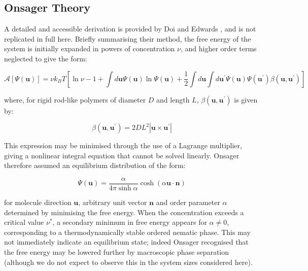 \documentclass[11pt, a4paper]{article} %
\begin{document}
\printbibliography

\begin{appendices}

\section{Onsager Theory} \label{sec:OnsagerAppendix}
A detailed and accessible derivation is provided by Doi and Edwards \cite{Doi1988}, and is not replicated in full here. Briefly summarising their method, the free energy of the system is initially expanded in powers of concentration $\nu$, and higher order terms neglected to give the form:

\begin{equation} \label{eq:OnsagerFreeEnergy}
\mathcal{A}[\Psi(\boldsymbol{u})] = \nu k_{B}T \left[ \ln\nu - 1 + \int d\boldsymbol{u} \Psi(\boldsymbol{u}) \ln \Psi(\boldsymbol{u}) + \frac{1}{2} \int d\boldsymbol{u} \int d\boldsymbol{u^{\prime}} \Psi(\boldsymbol{u}) \Psi(\boldsymbol{u^{\prime}}) \beta(\boldsymbol{u}, \boldsymbol{u^{\prime}})  \right]
\end{equation}

where, for rigid rod-like polymers of diameter $D$ and length $L$, $\beta(\boldsymbol{u}, \boldsymbol{u^{\prime}})$ is given by:

\begin{equation}
\beta(\boldsymbol{u}, \boldsymbol{u^{\prime}}) = 2DL^{2} \left\lvert \boldsymbol{u} \times \boldsymbol{u^{\prime}} \right\rvert
\end{equation} 

This expression may be minimised through the use of a Lagrange multiplier, giving a nonlinear integral equation that cannot be solved linearly. Onsager therefore assumed an equilibrium distribution of the form:

\begin{equation}
\Psi(\boldsymbol{u}) = \frac{\alpha}{4\pi\sinh\alpha} \cosh (\alpha \boldsymbol{u} \cdot \boldsymbol{n})
\end{equation}

for molecule direction $\boldsymbol{u}$, arbitrary unit vector $\boldsymbol{n}$ and order parameter $\alpha$ determined by minimising the free energy. When the concentration exceeds a critical value $\nu^{*}$, a secondary minimum in free energy appears for $\alpha \neq 0$, corresponding to a thermodynamically stable ordered nematic phase. This may not immediately indicate an equilibrium state; indeed Onsager recognised that the free energy may be lowered further by macroscopic phase separation (although we do not expect to observe this in the system sizes considered here). 


\end{appendices}
\end{document}

